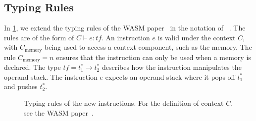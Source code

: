 \subsection{Typing Rules}
\label{subsec:typing}

In \cref{fig:typing-rules}, we extend the typing rules of the \ac{WASM} paper~\cite{haas2017bringing} in the notation of \citeauthor*{pierce2002types}~\cite{pierce2002types}.
The rules are of the form of $C \vdash e : \mathit{tf}$.
An instruction $e$ is valid under the context $C$, with $C_\text{memory}$ being used to access a context component, such as the memory.
The rule $C_\text{memory} = n$ ensures that the instruction can only be used when a memory is declared.
The type $\mathit{tf} = t_1^* \rightarrow t_2^*$ describes how the instruction manipulates the operand stack.
The instruction $e$ expects an operand stack where it pops off $t_1^*$ and pushes $t_2^*$.

\begin{figure}[t]
    \begin{prooftree}
    \end{prooftree}
    \begin{prooftree}
    \end{prooftree}
    \begin{prooftree}
    \end{prooftree}
    \caption{Typing rules of the new instructions. For the definition of context $C$, see the \ac{WASM} paper~\cite{haas2017bringing}.}
    \label{fig:typing-rules}
\end{figure}

